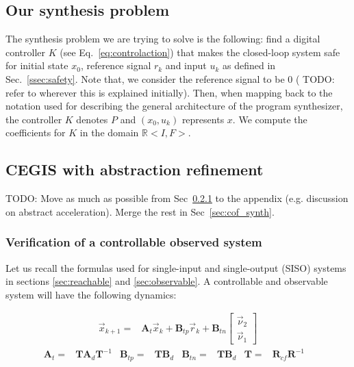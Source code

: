 \documentclass[runningheads,a4paper]{llncs}
\newcommand{\todo}[1]{{\color{red} TODO: #1}}
\newcommand{\mat}[1]{\boldsymbol{#1}}
\begin{document}
\subsection{Our synthesis problem}
The synthesis problem we are trying to solve is the following:
find a digital controller $K$ (see Eq.~\ref{eq:controlaction})
that makes the closed-loop system safe for 
initial state $x_0$, reference signal $r_k$ and input $u_k$
as defined in Sec.~\ref{ssec:safety}. Note that, 
we consider the reference signal to be 0 (\todo{refer to wherever this is explained initially}).
Then, when mapping back to the notation used for describing the general architecture 
of the program synthesizer, the controller $K$ denotes $P$ and 
$(x_0, u_k)$ represents $x$. 
We compute the coefficients for $K$ in the domain $\mathbb{R}<I,F>$.

\subsection{CEGIS with abstraction refinement}
\label{sec:CEGIS-abstraction-refinement}

\todo{Move as much as possible from Sec~\ref{sec:cof_verification}
to the appendix (e.g. discussion on abstract acceleration). 
Merge the rest in Sec~\ref{sec:cof_synth}.}

\subsubsection{Verification of a controllable observed system}
\label{sec:cof_verification}

Let us recall the formulas used for single-input and single-output (SISO) systems 
in sections \ref{sec:reachable} and \ref{sec:observable}.
A controllable and observable system will have the following dynamics:

%
\begin{align}
\label{eq:observer_LTI_cf}
\vec{x}_{k+1}=&\mat{A}_{t}\vec{x}_k+\mat{B}_{tp} \vec{r}_k+\mat{B}_{tn}\left [\begin{array}{c}\vec{\nu}_2\\ \vec{\nu}_1\end{array}\right]
\end{align}
\begin{align*}
\mat{A}_{t}=&\mat{T}\mat{A}_d\mat{T}^{-1}&
\mat{B}_{tp}=&\mat{T}\mat{B}_d&
\mat{B}_{tn}=&\mat{T}\mat{B}_d&
\mat{T}=&\mat{R}_{cf}\mat{R}^{-1}&
\end{align*}
\end{document}
